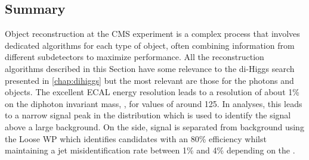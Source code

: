 \subsection{Summary}
Object reconstruction at the CMS experiment is a complex process that involves dedicated algorithms for each type of object, often combining information from different subdetectors to maximize performance. All the reconstruction algorithms described in this Section have some relevance to the di-Higgs search presented in \cref{chap:dihiggs} but the most relevant are those for the photons and \tauh objects. The excellent ECAL energy resolution leads to a resolution of about 1\% on the diphoton invariant mass, \mgg, for values of \mgg around 125\GeV. In \Hgg analyses, this leads to a narrow signal peak in the \mgg distribution which is used to identify the signal above a large background. On the \tauh side, signal is separated from background using the Loose \Djet WP which identifies \tauh candidates with an 80\% efficiency whilst maintaining a jet misidentification rate between 1\% and 4\% depending on the \tauh \pt.